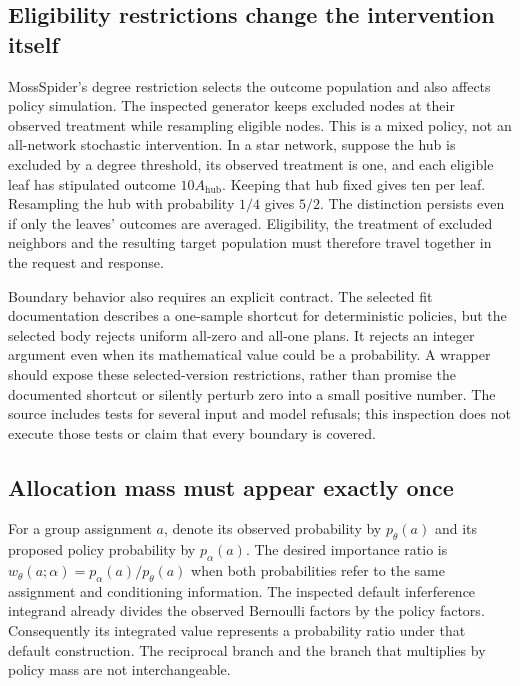 \subsection{Eligibility restrictions change the intervention itself}
MossSpider's degree restriction selects the outcome population and also affects
policy simulation. The inspected generator keeps excluded nodes at their
observed treatment while resampling eligible nodes. This is a mixed policy,
not an all-network stochastic intervention. In a star network, suppose the hub
is excluded by a degree threshold, its observed treatment is one, and each
eligible leaf has stipulated outcome $10A_{\mathrm{hub}}$. Keeping that hub
fixed gives ten per leaf. Resampling the hub with probability $1/4$ gives
$5/2$. The distinction persists even if only the leaves' outcomes are averaged.
Eligibility, the treatment of excluded neighbors and the resulting target
population must therefore travel together in the request and response.
\citep{exec24_interference_mossspider,exec24_interference_reference}

Boundary behavior also requires an explicit contract. The selected fit
documentation describes a one-sample shortcut for deterministic policies, but
the selected body rejects uniform all-zero and all-one plans. It rejects an
integer argument even when its mathematical value could be a probability. A
wrapper should expose these selected-version restrictions, rather than promise
the documented shortcut or silently perturb zero into a small positive number.
The source includes tests for several input and model refusals; this inspection
does not execute those tests or claim that every boundary is covered.
\citep{exec24_interference_mossspider}

\subsection{Allocation mass must appear exactly once}
For a group assignment $a$, denote its observed probability by $p_\theta(a)$
and its proposed policy probability by $p_\alpha(a)$. The desired importance
ratio is $w_\theta(a;\alpha)=p_\alpha(a)/p_\theta(a)$ when both probabilities
refer to the same assignment and conditioning information. The inspected
default inferference integrand already divides the observed Bernoulli factors
by the policy factors. Consequently its integrated value represents a
probability ratio under that default construction. The reciprocal branch and
the branch that multiplies by policy mass are not interchangeable.
\citep{exec24_interference_inferference}

